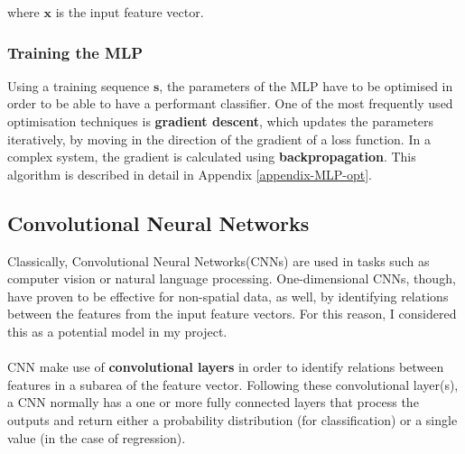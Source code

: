 	where $\mathbf{x}$ is the input feature vector.
	
	\subsubsection*{Training the MLP}
	Using a training sequence $\mathbf{s}$, the parameters of the MLP have to be optimised in order to be able to have a performant classifier. One of the most frequently used optimisation techniques is \textbf{gradient descent}, which updates the parameters iteratively, by moving in the direction of the gradient of a loss function. In a complex system, the gradient is calculated using \textbf{backpropagation}. This algorithm is described in detail in Appendix \ref{appendix-MLP-opt}. 
	
	\subsection{Convolutional Neural Networks} 
	Classically, Convolutional Neural Networks(CNNs) are used in tasks such as computer vision or natural language processing. One-dimensional CNNs, though, have proven to be effective for non-spatial data, as well, by identifying relations between the features from the input feature vectors. For this reason, I considered this as a potential model in my project. 
	\\ \\
	CNN make use of \textbf{convolutional layers} in order to identify relations between features in a subarea of the feature vector. 	Following these convolutional layer(s), a CNN normally has a one or more fully connected layers that process the outputs and return either a probability distribution (for classification) or a single value (in the case of regression).  
	
